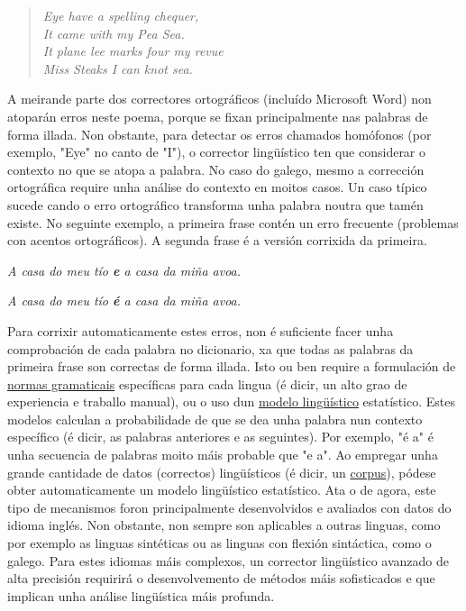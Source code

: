 \begin{multicols}{2}
\begin{verse}
\textit{Eye have a spelling chequer,} \\
\textit{It came with my Pea Sea.} \\
\textit{It plane lee marks four my revue} \\
\textit{Miss Steaks I can knot sea.} 
\end{verse}

A meirande parte dos correctores ortográficos (incluído Microsoft Word) non atoparán erros neste poema, porque se fixan principalmente nas palabras de forma illada. Non obstante, para detectar os erros chamados homófonos (por exemplo, "Eye" no canto de "I"), o corrector lingüístico ten que considerar o contexto no que se atopa a palabra. No caso do galego, mesmo a corrección ortográfica require unha análise do contexto en moitos casos. Un caso típico sucede cando o erro ortográfico transforma unha palabra noutra que tamén existe. No seguinte exemplo, a primeira frase contén un erro frecuente (problemas con acentos ortográficos). A segunda frase é a versión corrixida da primeira.

\textit{A casa do meu tío \textbf{e} a casa da miña avoa.}

\textit{A casa do meu tío \textbf{é} a casa da miña avoa.} 
 
Para corrixir automaticamente estes erros, non é suficiente facer unha comprobación de cada palabra no dicionario, xa que todas as palabras da primeira frase son correctas de forma illada. Isto ou ben require a formulación de \uline{normas gramaticais} específicas para cada lingua (é dicir, un alto grao de experiencia e traballo manual), ou o uso dun \uline{modelo lingüístico} estatístico. Estes modelos calculan a probabilidade de que se dea unha palabra nun contexto específico (é dicir, as palabras anteriores e as seguintes). Por exemplo, "é a" é unha secuencia de palabras moito máis probable que "e a". Ao empregar unha grande cantidade de datos (correctos) lingüísticos (é dicir, un \uline{corpus}), pódese obter automaticamente un modelo lingüístico estatístico. Ata o de agora, este tipo de mecanismos foron principalmente desenvolvidos e avaliados con datos do idioma inglés. Non obstante, non sempre son aplicables a outras linguas, como por exemplo as linguas sintéticas ou as linguas con flexión sintáctica, como o galego. Para estes idiomas máis complexos, un corrector lingüístico avanzado de alta precisión requirirá o desenvolvemento de métodos máis sofisticados e que implican unha análise lingüística máis profunda.


\end{multicols}
